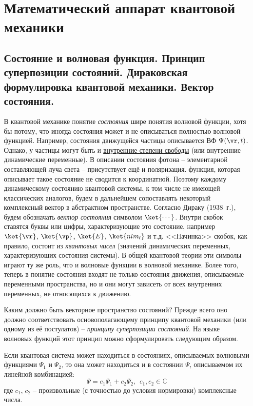 \chapter{Математический аппарат квантовой механики}

\begin{sloppypar}
  \section{Состояние и волновая функция. Принцип суперпозиции состояний. Дираковская формулировка квантовой механики. Вектор состояния.}
\end{sloppypar}

В квантовой механике понятие {\em состояния} шире понятия волновой функции, хотя бы потому, что иногда состояния может и не описываться полностью волновой функцией. Например, состояния движущейся частицы описывается ВФ $\Psi(\vr, t)$. Однако, у частицы могут быть и \underline{внутренние степени свободы} (или внутренние динамические переменные). В описании состояния фотона -- элементарной составляющей луча света -- присутствует ещё и поляризация. функция, которая описывает такое состояние не сводится к координатной. Поэтому каждому динамическому состоянию квантовой системы, к том числе не имеющей классических аналогов, будем в дальнейшем сопоставлять некоторый комплексный вектор в абстрактном пространстве. Согласно Дираку (1938~г.), будем обозначать {\em вектор состояния} символом $\ket{\cdots}$. Внутри скобок ставятся буквы или цифры, характеризующие это состояние, например $\ket{\vr}$, $\ket{\vp}$, $\ket{E}$, $\ket{nlm_l}$ и т.д. <<Начинка>> скобок, как правило, состоит из {\em квантовых чисел} (значений динамических переменных, характеризующих состояния системы). В общей квантовой теории эти символы играют ту же роль, что и волновые функции в волновой механике. Более того, теперь в понятие состояния входят не только состояния движения, описываемые переменными пространства, но и они могут зависеть от всех внутренних переменных, не относящихся к движению.

Каким должно быть векторное пространство состояний? Прежде всего оно должно соответствовать основополагающему принципу квантовой механики (или одному из её постулатов) -- {\em принципу суперпозиции состояний}. На языке волновых функций этот принцип можно сформулировать следующим образом.
%
\begin{stmt}
Если квантовая система может находиться в состояниях, описываемых волновыми функциями $\Psi_1$ и $\Psi_2$, то она может находиться и в состоянии $\Psi$, описываемом их линейной комбинацией:
$$
\Psi = c_1 \Psi_1 + c_2 \Psi_2, ~~c_1, c_2 \in \mathbb{C}
$$%
%
где $c_1$, $c_2$ -- произвольные (с точностью до условия нормировки) комплексные числа.
\end{stmt}

